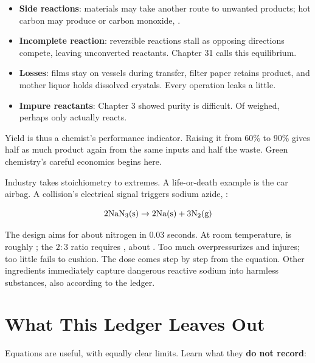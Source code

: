 \begin{itemize}[itemsep=2pt]
\item \textbf{Side reactions}: materials may take another route to unwanted products; hot carbon may produce  or carbon monoxide, .
\item \textbf{Incomplete reaction}: reversible reactions stall as opposing directions compete, leaving unconverted reactants. Chapter 31 calls this equilibrium.
\item \textbf{Losses}: films stay on vessels during transfer, filter paper retains product, and mother liquor holds dissolved crystals. Every operation leaks a little.
\item \textbf{Impure reactants}: Chapter 3 showed purity is difficult. Of  weighed, perhaps only  actually reacts.
\end{itemize}

Yield is thus a chemist's performance indicator. Raising it from 60\% to 90\% gives half as much product again from the same inputs and half the waste. Green chemistry's careful economics begins here.

Industry takes stoichiometry to extremes. A life-or-death example is the car airbag. A collision's electrical signal triggers sodium azide, :

\[\mathrm{2NaN_3(s)} \rightarrow \mathrm{2Na(s)} + \mathrm{3N_2(g)}\]

The design aims for about  nitrogen in 0.03 seconds. At room temperature,  is roughly ; the $2:3$ ratio requires  , about . Too much overpressurizes and injures; too little fails to cushion. The dose comes step by step from the equation. Other ingredients immediately capture dangerous reactive sodium into harmless substances, also according to the ledger.

\section{What This Ledger Leaves Out}

Equations are useful, with equally clear limits. Learn what they \textbf{do not record}:

